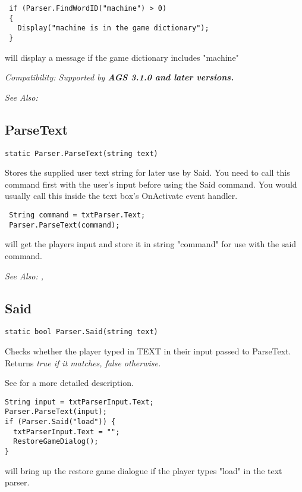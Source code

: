 \begin{verbatim}
 if (Parser.FindWordID("machine") > 0)
 {
   Display("machine is in the game dictionary");
 }
\end{verbatim}
will display a message if the game dictionary includes "machine"

\it{Compatibility:} Supported by \bf{AGS 3.1.0} and later versions.

\it{See Also:} 


\subsection{ParseText}\label{Parser.ParseText}%

\begin{verbatim}
static Parser.ParseText(string text)
\end{verbatim}
Stores the supplied user text string for later use by Said.
You need to call this command first with the user's input before using
the Said command. You would usually call this inside the text box's
OnActivate event handler.

\begin{verbatim}
 String command = txtParser.Text;
 Parser.ParseText(command);
\end{verbatim}
will get the players input and store it in string "command" for use with the said command.

\it{See Also:} ,


\subsection{Said}\label{Parser.Said}%

\begin{verbatim}
static bool Parser.Said(string text)
\end{verbatim}
Checks whether the player typed in TEXT in their input passed to ParseText.
Returns \it{true} if it matches, \it{false} otherwise.

See  for a more detailed description.


\begin{verbatim}
String input = txtParserInput.Text;
Parser.ParseText(input);
if (Parser.Said("load")) {
  txtParserInput.Text = "";
  RestoreGameDialog();
}
\end{verbatim}
will bring up the restore game dialogue if the player types "load" in the text parser.

